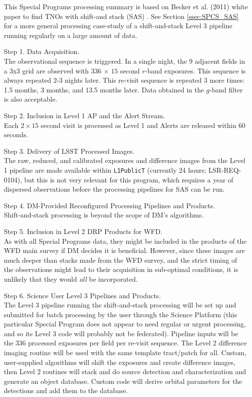 \documentclass[DM,lsstdraft,toc]{lsstdoc}
\begin{document}
This Special Programs processing summary is based on Becker et al. (2011) white paper to find TNOs with shift-and stack (SAS) \citep{BeckerWP}. See Section \ref{ssec:SPCS_SAS} for a more general processing case-study of a shift-and-stack Level 3 pipeline running regularly on a large amount of data.

Step 1. Data Acquisition. \\ 
The observational sequence is triggered. In a single night, the 9 adjacent fields in a 3x3 grid are observed with $336$ $\times$ $15$ second $r$-band exposures. This sequence is always repeated 2-3 nights later. This re-visit sequence is repeated 3 more times: 1.5 months, 3 months, and 13.5 months later. Data obtained in the $g$-band filter is also acceptable. \citep{BeckerWP}

Step 2. Inclusion in Level 1 AP and the Alert Stream. \\ 
Each $2\times15$ second visit is processed as Level 1 and Alerts are released within 60 seconds.

Step 3. Delivery of LSST Processed Images. \\ 
The raw, reduced, and calibrated exposures and difference images from the Level 1 pipeline are made available within {\tt L1PublicT} (currently 24 hours; LSR-REQ-0104), but this is not very relevant for this program, which requires a year of dispersed observations before the processing pipelines for SAS can be run.

Step 4. DM-Provided Reconfigured Processing Pipelines and Products. \\ 
Shift-and-stack processing is beyond the scope of DM's algorithms.

Step 5. Inclusion in Level 2 DRP Products for WFD. \\ 
As with all Special Programs data, they might be included in the products of the WFD main survey if DM decides it is beneficial. However, since these images are much deeper than stacks made from the WFD survey, and the strict timing of the observations might lead to their acquisition in sub-optimal conditions, it is unlikely that they would {\it all} be incorporated. 

Step 6. Science User Level 3 Pipelines and Products. \\
The Level 3 pipeline running the shift-and-stack processing will be set up and submitted for batch processing by the user through the Science Platform (this particular Special Program does not appear to need regular or urgent processing, and so its Level 3 code will probably not be federated). Pipeline inputs will be the 336 processed exposures per field per re-visit sequence. The Level 2 difference imaging routine will be used with the same template tract/patch for all. Custom, user-supplied algorithms will shift the exposures and create difference images, then Level 2 routines will stack and do source detection and characterization and generate an object database. Custom code will derive orbital parameters for the detections and add them to the database.
\end{document}
